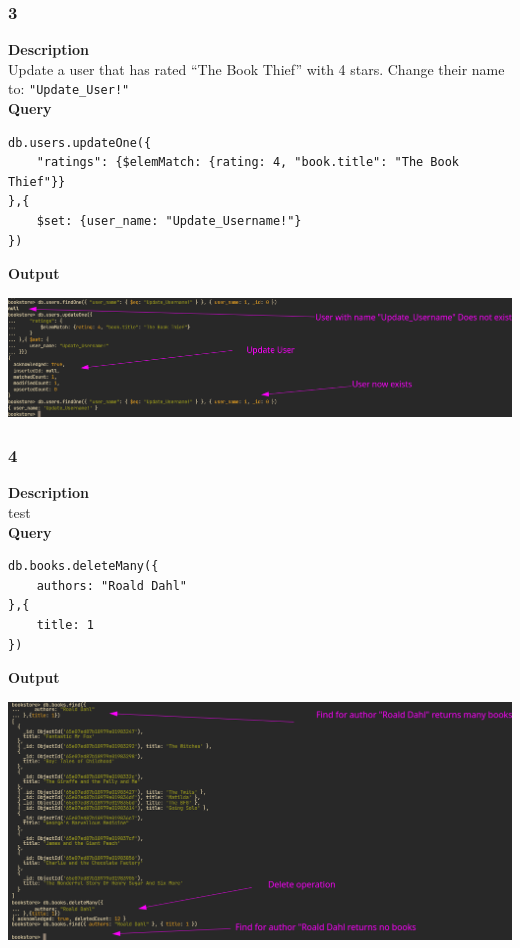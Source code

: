 \documentclass[11pt]{article}
\begin{document}
\subsubsection{3}
\label{sec:org1cf562b}
\textbf{Description}\\
Update a user that has rated ``The Book Thief'' with 4 stars. Change their name to: \texttt{"Update\_User!"}\\
\linebreak
\textbf{Query}
\begin{verbatim}
db.users.updateOne({
    "ratings": {$elemMatch: {rating: 4, "book.title": "The Book Thief"}}
},{
    $set: {user_name: "Update_Username!"}
})
\end{verbatim}
\linebreak
\textbf{Output}\\
\begin{center}
\includegraphics[width=1\textwidth]{images/CRGMAT002/3.png}
\end{center}
\pagebreak
\subsubsection{4}
\label{sec:org1ce98e7}
\textbf{Description}\\
test\\
\linebreak
\textbf{Query}
\begin{verbatim}
db.books.deleteMany({
    authors: "Roald Dahl"
},{
    title: 1
})
\end{verbatim}

\linebreak
\textbf{Output}\\
\begin{center}
\includegraphics[width=1\textwidth]{images/CRGMAT002/4.png}
\end{center}
\pagebreak
\end{document}
